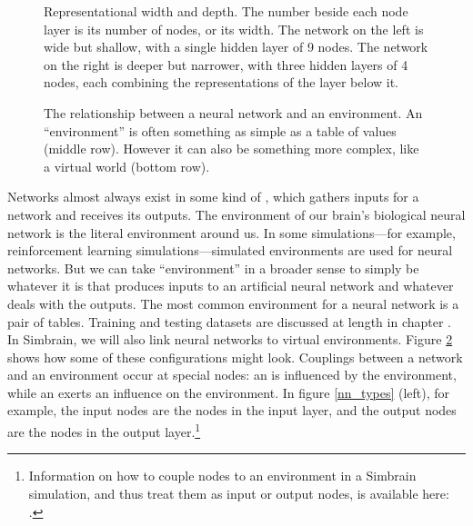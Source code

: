 \begin{figure}[htbp]
\centering
{}
\caption[Jeff Yoshimi.]{Representational width and depth. The number beside each node layer is its number of nodes, or its width. The network on the left is wide but shallow, with a single hidden layer of 9 nodes. The network on the right is deeper but narrower, with three hidden layers of 4 nodes, each combining the representations of the layer below it.}
\label{repWidthDepth}
\end{figure}

\begin{figure}[h]
\centering
{}
\caption[Pamela Payne.]{The relationship between a neural network and an environment. An ``environment'' is often something as simple as a table of values (middle row). However it can also be something more complex, like a virtual world (bottom row).}
\label{nn_environment}
\end{figure}

Networks almost always exist in some kind of  , which gathers inputs for a network and receives its outputs. The environment of our brain's biological neural network is the literal environment around us. In some simulations---for example, reinforcement learning simulations---simulated environments are used for neural networks. But we can take ``environment'' in a broader sense to simply be whatever it is that produces inputs to an artificial neural network and whatever deals with the outputs. The most common environment for a neural network is a pair of tables. Training and testing datasets are discussed at length in chapter . In Simbrain, we will also link neural networks to virtual environments. Figure \ref{nn_environment} shows how some of these configurations might look. Couplings between a network and an environment occur at special nodes: an  is influenced by the environment, while an  exerts an influence on the environment. In figure \ref{nn_types} (left), for example, the input nodes are the nodes in the input layer, and the output nodes are the nodes in the output layer.\footnote{Information on how to couple nodes to an environment in a Simbrain simulation, and thus treat them as input or output nodes, is available here: .}

